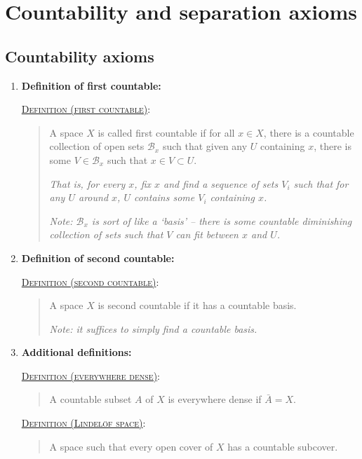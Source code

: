 \documentclass[letterpaper, 12pt]{book}
\newcommand{\ms}[1]{\mathscr{#1}}
\newcommand{\defn}[2]{\textsc{\underline{Definition (#1)}:}\begin{quote} #2\end{quote}}
\begin{document}
\chapter{Countability and separation axioms}
\section{Countability axioms}
    \begin{enumerate}[resume]
    \item \textbf{Definition of first countable:}

        \defn{first countable}{A space $X$ is called first countable if for all $x\in X$, there is a countable collection of open sets $\ms{B}_x$ such that given any $U$ containing $x$, there is some $V\in\ms{B}_x$ such that $x\in V\subset U$.

        \textit{That is, for every $x$, fix $x$ and find a sequence of sets $V_i$ such that for any $U$ around $x$, $U$ contains some $V_i$ containing $x$.}

        \textit{Note: $\ms{B}_x$ is sort of like a `basis' -- there is some countable diminishing collection of sets such that $V$ can fit between $x$ and $U$.}}
    \item \textbf{Definition of second countable:}

        \defn{second countable}{A space $X$ is second countable if it has a countable basis.

        \textit{Note: it suffices to simply find a countable basis.}}
    \item \textbf{Additional definitions:}

        \defn{everywhere dense}{A countable subset $A$ of $X$ is everywhere dense if $\bar{A} = X$.}

        \defn{Lindel\"of space}{A space such that every open cover of $X$ has a countable subcover.}


\end{enumerate}
\end{document}
